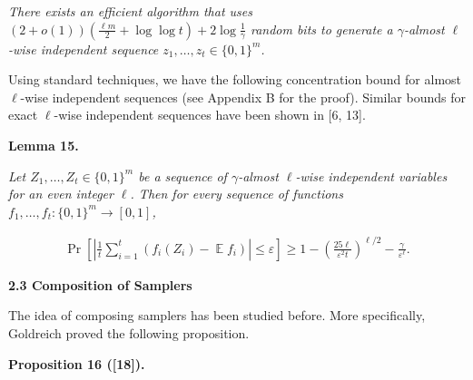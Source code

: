 \emph{There exists an efficient algorithm that uses
$(2+o(1))(\frac{\ell m}{2}+\log\log t)+2\log\frac{1}{\gamma}$
random bits to generate a $\gamma$-almost $\ell$-wise independent sequence $z_{1},\dots,z_{t}\in\{0,1\}^{m}$.}\par






Using standard techniques, we have the following concentration bound for almost $\ell$-wise independent sequences (see Appendix B for the proof). Similar bounds for exact $\ell$-wise independent sequences have been shown in [6, 13].\par





\par\medskip\noindent\textbf{
\textbf{Lemma 15}\textbf{.}
}\par



\emph{Let $Z_{1},\dots,Z_{t}\in\{0,1\}^{m}$ be a sequence of $\gamma$-almost $\ell$-wise independent variables for an even integer $\ell$. Then for every sequence of functions $f_{1},\dots,f_{t}:\{0,1\}^{m}\to[0,1]$,}\par


\[\begin{gathered}
\Pr\left[\left|\frac{1}{t}\sum_{i=1}^{t}(f_{i}(Z_{i})-\operatorname*{\mathbb{E}}f_{i})\right|\leq\varepsilon\right]\geq 1-\left(\frac{25{\ell}}{\varepsilon^{2}{t}}\right)^{\ell/2}-\frac{\gamma}{\varepsilon^{\ell}}.
\end{gathered}\]







\par\medskip\noindent\textbf{
2.3 Composition of Samplers}\par




The idea of composing samplers has been studied before. More specifically, Goldreich proved the following proposition.\par





\par\medskip\noindent\textbf{
\textbf{Proposition 16}\textbf{ }([18])\textbf{.}
}\par



